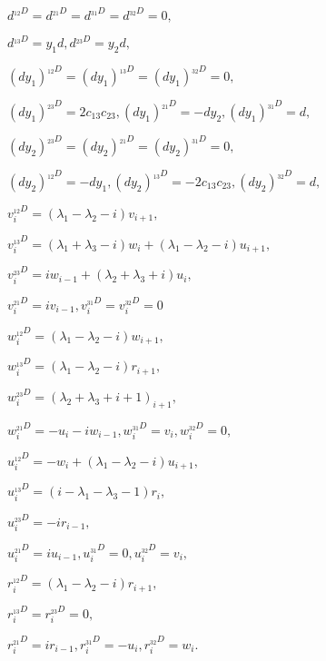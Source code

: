 \newpage

$ d^{_{12}D} = d^{_{21}D} = d^{_{31}D} = d^{_{32}D} = 0, $

$ d^{_{13}D} = y_1 d, d^{_{23}D} = y_2 d, $
\newline

$ (d y_1)^{_{12}D} = (d y_1)^{_{13}D} = (d y_1)^{_{32}D} = 0, $

$ (d y_1)^{_{23}D} = 2 c_{13} c_{23}, (d y_1)^{_{21}D} = -d y_2, (d y_1)^{_{31}D} = d, $
\newline

$ (d y_2)^{_{23}D} = (d y_2)^{_{21}D} = (d y_2)^{_{31}D} = 0, $

$ (d y_2)^{_{12}D} = -d y_1, (d y_2)^{_{13}D} = -2 c_{13} c_{23}, (d y_2)^{_{32}D} = d, $
\newline

$ v_i^{_{12}D} = (\lambda_1 - \lambda_2 - i)v_{i + 1}, $

$ v_i^{_{13}D} = (\lambda_1 + \lambda_3 - i)w_i + (\lambda_1 - \lambda_2 - i)u_{i + 1}, $

$ v_i^{_{23}D} = i w_{i - 1} + (\lambda_2 + \lambda_3 + i)u_i, $

$ v_i^{_{21}D} = i v_{i - 1}, v_i^{_{31}D} = v_i^{_{32}D} = 0 $
\newline

$ w_i^{_{12}D} = (\lambda_1 - \lambda_2 - i)w_{i + 1}, $

$ w_i^{_{13}D} = (\lambda_1 - \lambda_2 - i)r_{i + 1}, $

$ w_i^{_{23}D} = (\lambda_2 + \lambda_3 + i + 1)_{i + 1}, $

$ w_i^{_{21}D} = -u_i - i w_{i - 1}, w_i^{_{31}D} = v_i, w_i^{_{32}D} = 0, $
\newline

$ u_i^{_{12}D} = - w_i + (\lambda_1 - \lambda_2 - i)u_{i + 1}, $

$ u_i^{_{13}D} = (i - \lambda_1 - \lambda_3 - 1)r_i, $

$ u_i^{_{23}D} = -i r_{i - 1}, $

$ u_i^{_{21}D} = i u_{i - 1}, u_i^{_{31}D} = 0, u_i^{_{32}D} = v_i, $
\newline

$ r_i^{_{12}D} = (\lambda_1 - \lambda_2 - i)r_{i + 1}, $

$ r_i^{_{13}D} = r_i^{_{23}D} = 0, $

$ r_i^{_{21}D} = i r_{i - 1}, r_i^{_{31}D} = -u_i, r_i^{_{32}D} = w_i. $